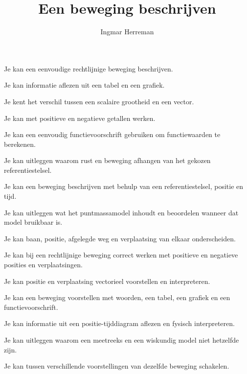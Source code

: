 \documentclass{ximera}
\title{Een beweging beschrijven}
\author{Ingmar Herreman}
\begin{document}





\maketitle



\begin{voorkennis}
  \item Je kan een eenvoudige rechtlijnige beweging beschrijven.
  \item Je kan informatie aflezen uit een tabel en een grafiek.
  \item Je kent het verschil tussen een scalaire grootheid en een vector.
  \item Je kan met positieve en negatieve getallen werken.
  \item Je kan een eenvoudig functievoorschrift gebruiken om functiewaarden te berekenen.
\end{voorkennis}

\begin{leerdoelen}
  \item Je kan uitleggen waarom rust en beweging afhangen van het gekozen referentiestelsel.
  \item Je kan een beweging beschrijven met behulp van een referentiestelsel, positie en tijd.
  \item Je kan uitleggen wat het puntmassamodel inhoudt en beoordelen wanneer dat model bruikbaar is.
  \item Je kan baan, positie, afgelegde weg en verplaatsing van elkaar onderscheiden.
  \item Je kan bij een rechtlijnige beweging correct werken met positieve en negatieve posities en verplaatsingen.
  \item Je kan positie en verplaatsing vectorieel voorstellen en interpreteren.
  \item Je kan een beweging voorstellen met woorden, een tabel, een grafiek en een functievoorschrift.
  \item Je kan informatie uit een positie-tijddiagram aflezen en fysisch interpreteren.
  \item Je kan uitleggen waarom een meetreeks en een wiskundig model niet hetzelfde zijn.
  \item Je kan tussen verschillende voorstellingen van dezelfde beweging schakelen.
\end{leerdoelen}
\end{document}
